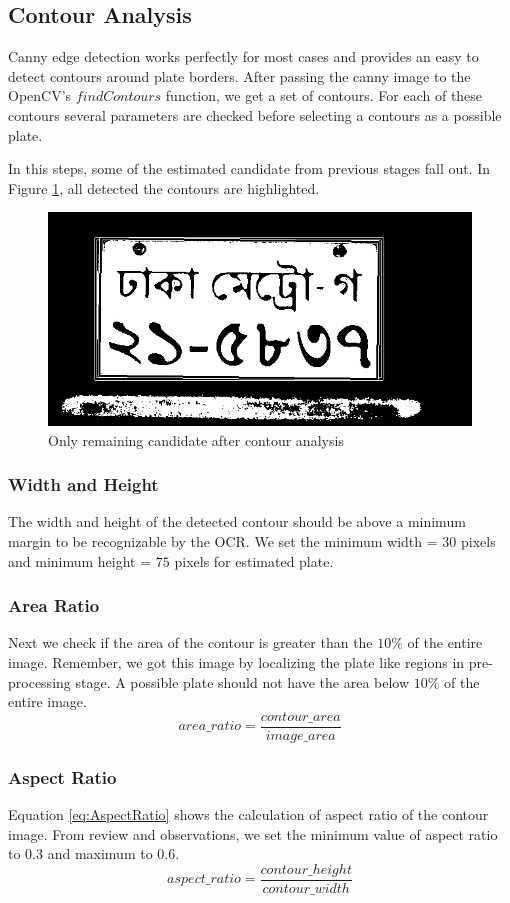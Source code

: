 \documentclass{standalone}
\begin{document}
\subsection{Contour Analysis}
Canny edge detection works perfectly for most cases and provides an easy to detect contours around plate borders. After passing the canny image to the OpenCV's $findContours$ function, we get a set of contours. For each of these contours several parameters are checked before selecting a contours as a possible plate.

In this steps, some of the estimated candidate from previous stages fall out. In Figure \ref{fig:ContourImage}, all detected the contours are highlighted.
\begin{figure}
    \centering
    \includegraphics[width=.7\linewidth]{./img/sample/stage9.jpg}
    \caption{Only remaining candidate after contour analysis}
    \label{fig:ContourImage}
\end{figure}

\subsubsection{Width and Height}
The width and height of the detected contour should be above a minimum margin to be recognizable by the OCR. We set the minimum width = $30$ pixels and minimum height = $75$ pixels for estimated plate.

\subsubsection{Area Ratio}
Next we check if the area of the contour is greater than the $10\%$ of the entire image. Remember, we got this image by localizing the plate like regions in pre-processing stage. A possible plate should not have the area below $10\%$ of the entire image.
\begin{equation}
area\_ratio = \dfrac{contour\_area}{image\_area }
\end{equation}

\subsubsection{Aspect Ratio}
Equation \ref{eq:AspectRatio} shows the calculation of aspect ratio of the contour image. From review and observations, we set the minimum value of aspect ratio to $0.3$ and maximum to $0.6$.
\begin{equation} \label{eq:AspectRatio}
aspect\_ratio = \dfrac{contour\_height}{contour\_width}
\end{equation}
\end{document}
